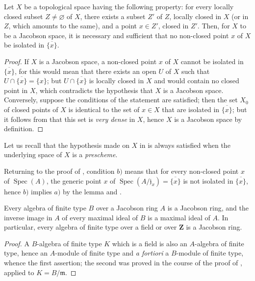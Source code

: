 \begin{lemma}[10.4.5.1]
\label{IV.10.4.5.1}
Let $X$ be a topological space having the following property: for every locally closed subset $Z\neq\varnothing$ of $X$, there exists a subset $Z'$ of $Z$, locally closed in $X$ (or in $Z$, which amounts to the same), and a point $x\in Z'$, closed in $Z'$.
Then, for $X$ to be a Jacobson space, it is necessary and sufficient that no non-closed point $x$ of $X$ be isolated in $\overline{\{x\}}$.
\end{lemma}

\begin{proof}
If $X$ is a Jacobson space, a non-closed point $x$ of $X$ cannot be isolated in $\overline{\{x\}}$, for this would mean that there exists an open $U$ of $X$ such that $U\cap\overline{\{x\}}=\{x\}$; but $U\cap\overline{\{x\}}$ is locally closed in $X$ and would contain no closed point in $X$, which contradicts the hypothesis that $X$ is a Jacobson space.
Conversely, suppose the conditions of the statement are satisfied; then the set $X_0$ of closed points of $X$ is identical to the set of $x\in X$ that are isolated in $\overline{\{x\}}$; but it follows from  that
this set is \emph{very dense} in $X$, hence $X$ is a Jacobson space by definition.
\end{proof}

Let us recall  that the hypothesis made on $X$ in  is always satisfied when the underlying space of $X$ is a \emph{prescheme}.

Returning to the proof of , condition $b)$ means that for every non-closed point $x$ of $\operatorname{Spec}(A)$, the generic point $x$ of $\operatorname{Spec}(A/\mathfrak{j}_x)=\overline{\{x\}}$ is not isolated in $\overline{\{x\}}$, hence $b)$ implies $a)$ by the lemma  and .

\begin{corollary}[10.4.6]
\label{IV.10.4.6}
Every algebra of finite type $B$ over a Jacobson ring $A$ is a Jacobson ring, and the inverse image in $A$ of every maximal ideal of $B$ is a maximal ideal of $A$.
In particular, every algebra of finite type over a field or over $\mathbf{Z}$ is a Jacobson ring.
\end{corollary}

\begin{proof}
A $B$-algebra of finite type $K$ which is a field is also an $A$-algebra of finite type, hence an $A$-module of finite type and \emph{a fortiori} a $B$-module of finite type, whence the first assertion; the second was proved in the course of the proof of , applied to $K=B/\mathfrak{m}$.
\end{proof}

